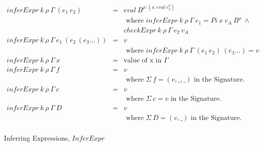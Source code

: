 \begin{figure}[H]
  \begin{equation*}
    \begin{aligned}
      inferExpr \: k \: \rho \: \Gamma \: (e_1 \: e_2)                & = & eval \: B^{\rho:(x,eval \: e_2^{\rho})}                                                        \\
                                                                      &   & \textrm{ where } inferExpr \: k \: \rho \: \Gamma \: e_1 = Pi \: x \: v_A \: B^{\rho} \: \land \\
                                                                      &   & checkExpr \: k \: \rho \: \Gamma \: e_2 \: v_A                                                 \\
      inferExpr \: k \: \rho \: \Gamma \: e_1 \: (e_2 \: (e_3 \dots)) & = & v                                                                                              \\
                                                                      &   & \textrm{ where } inferExpr \: k \: \rho \: \Gamma \: (e_1 \: e_2) \: (e_3 \dots) = v           \\
      inferExpr \: k \: \rho \: \Gamma \: x                           & = & \textrm{value of x in } \Gamma                                                                 \\
      inferExpr \: k \: \rho \: \Gamma \: f                           & = & v                                                                                              \\
                                                                      &   & \textrm{ where } \Sigma \: f = (v,\_,\_) \textrm{ in the Signature.}                           \\
      inferExpr \: k \: \rho \: \Gamma \: c                           & = & v                                                                                              \\
                                                                      &   & \textrm{ where } \Sigma \: c = v \textrm{ in the Signature.}                                   \\
      inferExpr \: k \: \rho \: \Gamma \: D                           & = & v                                                                                              \\
                                                                      &   & \textrm{ where } \Sigma \: D = (v,\_) \textrm{ in the Signature.}                              \\
    \end{aligned}
  \end{equation*}
  \caption{Inferring Expressions, $InferExpr$}
\end{figure}

